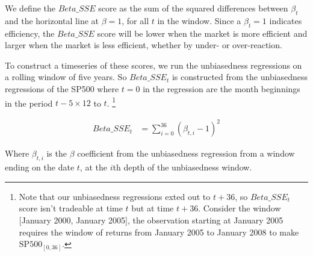 We define the $Beta\_SSE$ score as the sum of the squared differences between $\beta_t$ and the horizontal line at $\beta = 1$, for all $t$ in the window.
Since a $\beta_t = 1$ indicates efficiency, the $Beta\_SSE$ score will be lower when the market is more efficient and larger when the market is less efficient, whether by under- or over-reaction.

To construct a timeseries of these scores, we run the unbiasedness regressions on a rolling window of five years.
So $Beta\_SSE_t$ is constructed from the unbiasedness regressions of the SP500 where $t=0$ in the regression are the month beginnings in the period
$t - 5 \times 12$ to $t$.
\footnote{Note that our unbiasedness regressions exted out to $t+36$, so $Beta\_SSE_t$ score isn't tradeable at time $t$ but at time $t+36$. Consider the window [January 2000, January 2005], the observation starting at January 2005 requires the window of returns from January 2005 to January 2008 to make $\mathrm{SP500}_{[0, 36]}$.}

\begin{equation}
    \begin{aligned}
        Beta\_SSE_t &= \sum_{i=0}^{36} (\beta_{t,i} - 1)^2
    \end{aligned}
\end{equation}

Where $\beta_{t,i}$ is the $\beta$ coefficient from the unbiasedness regression from a 
window ending on the date $t$, at the $i$th depth of the unbiasedness window.
